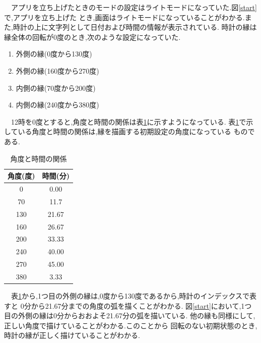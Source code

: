 \documentclass[a4j]{jarticle}
\begin{document}
      　アプリを立ち上げたときのモードの設定はライトモードになっていた.図\ref{start}で,アプリを立ち上げた
      とき,画面はライトモードになっていることがわかる.また,時計の上に文字列として日付および時間の情報が表示されている.
      時計の縁は縁全体の回転が0度のとき,次のような設定になっていた.
      \begin{enumerate}
        \item 外側の縁(0度から130度)
        \item 外側の縁(160度から270度)
        \item 内側の縁(70度から200度) 
        \item 内側の縁(240度から380度)
      \end{enumerate}
      　12時を0度とすると,角度と時間の関係は表\ref{timedo}に示すようになっている.
      表\ref{timedo}で示している角度と時間の関係は,縁を描画する初期設定の角度になっている
      ものである.
      \begin{table}[H]
        \caption{角度と時間の関係}
      \label{timedo}
      \begin{center}
          \begin{tabular}{c|c}\hline
            角度(度) & 時間(分) \\ \hline 
            0 & 0.00 \\
            70 & 11.7 \\
            130 & 21.67 \\
            160 & 26.67 \\
            200 & 33.33 \\
            240 & 40.00 \\
            270 & 45.00 \\
            380 & 3.33 \\ \hline
          \end{tabular}
      \end{center}
      \end{table}

      　表\ref{timedo}から,1つ目の外側の縁は,0度から130度であるから,時計のインデックスで表すと
      0分から21.67分までの角度の弧を描くことがわかる.
      図\ref{start}において,1つ目の外側の縁は0分からおおよそ21.67分の弧を描いている.
      他の縁も同様にして,正しい角度で描けていることがわかる.このことから
      回転のない初期状態のとき,時計の縁が正しく描けていることがわかる.
\end{document}
